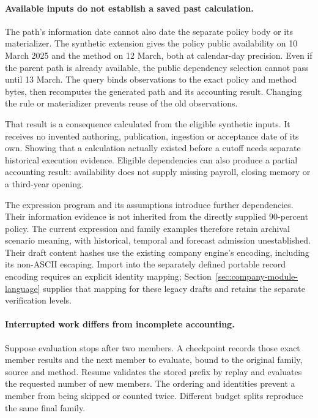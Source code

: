 \paragraph{Available inputs do not establish a saved past calculation.}
The path's information date cannot also date the separate policy body or its
materializer. The synthetic extension gives the policy public availability on
10 March 2025 and the method on 12 March, both at calendar-day precision.
Even if the parent path is already available, the public dependency selection
cannot pass until 13 March. The query binds observations to the exact policy
and method bytes, then recomputes the generated path and its accounting result.
Changing the rule or materializer prevents reuse of the old observations.

That result is a consequence calculated from the eligible synthetic inputs.
It receives no invented authoring, publication, ingestion or acceptance date
of its own. Showing that a calculation actually existed before a cutoff needs
separate historical execution evidence. Eligible dependencies can also produce
a partial accounting result: availability does not supply missing payroll,
closing memory or a third-year opening.

The expression program and its assumptions introduce further dependencies.
Their information evidence is not inherited from the directly supplied
90-percent policy. The current expression and family examples therefore retain
archival scenario meaning, with historical, temporal and forecast admission
unestablished. Their draft content hashes use the existing company engine's
encoding, including its non-ASCII escaping. Import into the separately defined
portable record encoding requires an explicit identity mapping;
Section~\ref{sec:company-module-language} supplies that mapping for these
legacy drafts and retains the separate verification levels.

\paragraph{Interrupted work differs from incomplete accounting.}
Suppose evaluation stops after two members. A checkpoint records those exact
member results and the next member to evaluate, bound to the original family,
source and method. Resume validates the stored prefix by replay and evaluates
the requested number of new members. The ordering and identities prevent a
member from being skipped or counted twice. Different budget splits reproduce
the same final family.

